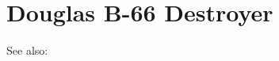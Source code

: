 \section{Douglas B-66 Destroyer}

\begin{adclist}
\end{adclist}

See also:
\begin{typelist}
\end{typelist}